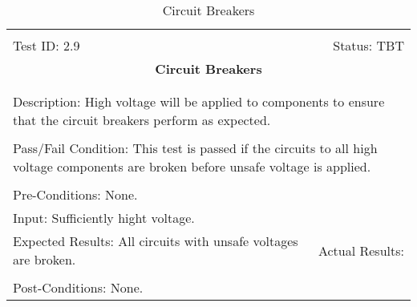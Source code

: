 \documentclass[titlepage]{article}
\begin{document}
\begin{center}%
\begin{table}[h!]
\begin{tabular}{|l r|}\hline&\\[-2mm]
	Test ID: 2.9	&Status: TBT\\[-3mm]
	\multicolumn{2}{|c|}{\textbf{\large{Circuit Breakers}}}\\&\\\hline&\\[-3mm]
	\multicolumn{2}{|p{\textwidth}|}{Description: High voltage will be applied to components to ensure that the circuit breakers perform as expected.}\\[1mm]\hline&\\[-3mm]
	\multicolumn{2}{|p{\textwidth}|}{Pass/Fail Condition: This test is passed if the circuits to all high voltage components are broken before unsafe voltage is applied.}\\[1mm]\hline&\\[-3mm]
	\multicolumn{2}{|p{\textwidth}|}{Pre-Conditions: None.}\\[4mm]
	\multicolumn{2}{|p{\textwidth}|}{Input: Sufficiently hight voltage.}\\[2mm]\hline
	\multicolumn{1}{|p{0.49\textwidth}}{Expected Results: All circuits with unsafe voltages are broken.}	&\multicolumn{1}{|p{0.45\textwidth}|}{Actual Results:}\\\hline&\\[-3mm]
	\multicolumn{2}{|p{\textwidth}|}{Post-Conditions: None.}\\\hline
\end{tabular}
\caption{Circuit Breakers}
\end{table}
\end{center}
\end{document}
